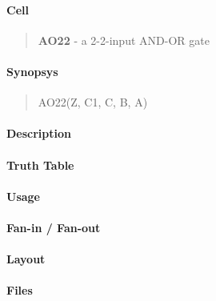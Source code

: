 \label{AO22}
\paragraph{Cell}
\begin{quote}
    \textbf{AO22} - a 2-2-input AND-OR gate
\end{quote}

\paragraph{Synopsys}
\begin{quote}
    AO22(Z, C1, C, B, A)
\end{quote}

\paragraph{Description}

%

\paragraph{Truth Table}
%

\paragraph{Usage}

\paragraph{Fan-in / Fan-out}

\paragraph{Layout}

\paragraph{Files}
